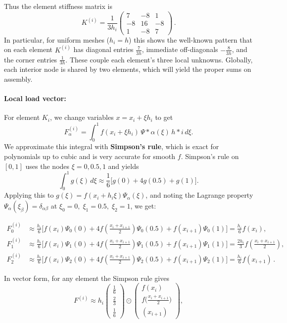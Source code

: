 \documentclass[a4paper,10pt]{article}
\begin{document}
Thus the element stiffness matrix is
\[
	K^{(i)} = \frac{1}{3 h_i}
	\begin{pmatrix} 
		7 & -8 & 1\\ 
		-8 & 16 & -8\\ 
		1 & -8 & 7
	\end{pmatrix}\,.
\]
In particular, for uniform meshes (\(h_i=h\)) this shows the well-known pattern that on each element \(K^{(i)}\) has diagonal entries \(\frac{7}{3h}\), immediate off-diagonals \(-\frac{8}{3h}\), and the corner entries \(\frac{1}{3h}\).
These couple each element's three local unknowns.
Globally, each interior node is shared by two elements, which will yield the proper sums on assembly.

\paragraph{Local load vector:} For element \(K_i\), we change variables \(x = x_i + \xi h_i\) to get
\[
F^{(i)}_\alpha = \int_{0}^{1} f(x_i + \xi h_i)\,\Psi*\alpha(\xi)\,h*i\,d\xi.
\]
We approximate this integral with \textbf{Simpson's rule}, which is exact for polynomials up to cubic and is very accurate for smooth \(f\).
Simpson's rule on \([0,1]\) uses the nodes \(\xi=0,0.5,1\) and yields
\[
\int_{0}^{1} g(\xi)\,d\xi \approx \frac{1}{6}\Big[g(0)+4g(0.5)+g(1)\Big].
\]
Applying this to \(g(\xi)=f(x_i+h_i\xi)\Psi_\alpha(\xi)\), and noting the Lagrange property \(\Psi_\alpha(\xi_{\beta})=\delta_{\alpha\beta}\) at \(\xi_0=0,\;\xi_1=0.5,\;\xi_2=1\), we get:

\begin{align*}
	F^{(i)}_0 & \approx \frac{h_i}{6}\big[f(x_i)\Psi_0(0) + 4f(\tfrac{x_i+x_{i+1}}{2})\Psi_0(0.5)+f(x_{i+1})\Psi_0(1)\big] = \frac{h_i}{6} f(x_i),                                 \\
	F^{(i)}_1 & \approx \frac{h_i}{6}\big[f(x_i)\Psi_1(0) + 4f(\tfrac{x_i+x_{i+1}}{2})\Psi_1(0.5)+f(x_{i+1})\Psi_1(1)\big] = \frac{2h_i}{3} f\!\left(\frac{x_i+x_{i+1}}{2}\right), \\
	F^{(i)}_2 & \approx \frac{h_i}{6}\big[f(x_i)\Psi_2(0) + 4f(\tfrac{x_i+x_{i+1}}{2})\Psi_2(0.5)+f(x_{i+1})\Psi_2(1)\big] = \frac{h_i}{6} f(x_{i+1})\,.
\end{align*}

In vector form, for any element the Simpson rule gives
\[F^{(i)} \approx h_i \begin{pmatrix} 	\frac{1}{6} \\[1ex]\frac{2}{3}\\[1ex] 	\frac{1}{6} \end{pmatrix} \odot \begin{pmatrix} 	f(x_i)                             \\[1ex] 	f\!\big(\frac{x_i+x_{i+1}}{2}\big) \\[1ex] 	(x_{i+1}) \end{pmatrix},\]
\end{document}

